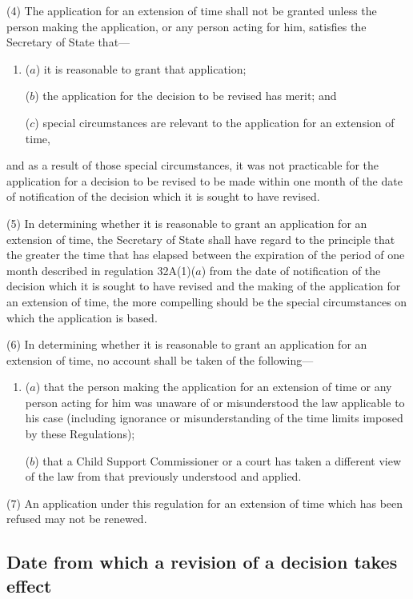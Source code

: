 \documentclass[12pt,a4paper]{article}
\begin{document}
(4) The application for an extension of time shall not be granted unless the person making the application, or any person acting for him, satisfies the Secretary of State that---
\begin{enumerate}\item[]
($a$) it is reasonable to grant that application;

($b$) the application for the decision to be revised has merit; and

($c$) special circumstances are relevant to the application for an extension of time,
\end{enumerate}
and as a result of those special circumstances, it was not practicable for the application for a decision to be revised to be made within one month of the date of notification of the decision which it is sought to have revised.

(5) In determining whether it is reasonable to grant an application for an extension of time, the Secretary of State shall have regard to the principle that the greater the time that has elapsed between the expiration of the period of one month described in regulation 32A(1)($a$) from the date of notification of the decision which it is sought to have revised and the making of the application for an extension of time, the more compelling should be the special circumstances on which the application is based.

(6) In determining whether it is reasonable to grant an application for an extension of time, no account shall be taken of the following---
\begin{enumerate}\item[]
($a$) that the person making the application for an extension of time or any person acting for him was unaware of or misunderstood the law applicable to his case (including ignorance or misunderstanding of the time limits imposed by these Regulations);

($b$) that a Child Support Commissioner or a court has taken a different view of the law from that previously understood and applied.
\end{enumerate}

(7) An application under this regulation for an extension of time which has been refused may not be renewed.


\subsection[32C. Date from which a revision of a decision takes effect]{Date from which a revision of a decision takes effect}
\end{document}
